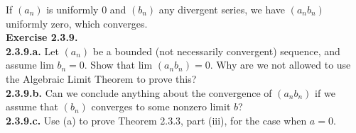 \documentclass[12pt,letterpaper]{article}
\begin{document}
If \((a_{n})\) is uniformly \(0\) and \((b_{n})\) any divergent series, we have \((a_{n}b_{n})\) uniformly zero, which converges. \\

\textbf{Exercise 2.3.9.} \\

\textbf{2.3.9.a.} Let \((a_{n})\) be a bounded (not necessarily convergent) sequence, and assume \(\text{lim } b_{n} = 0\). Show that \(\text{lim }(a_{n}b_{n}) = 0.\) Why are we not allowed to use the Algebraic Limit Theorem to prove this? \\



\textbf{2.3.9.b.} Can we conclude anything about the convergence of \((a_{n}b_{n})\) if we assume that \((b_{n})\) converges to some nonzero limit \(b\)? \\



\textbf{2.3.9.c.} Use (a) to prove Theorem 2.3.3, part (iii), for the case when \(a = 0\). \\
\end{document}
